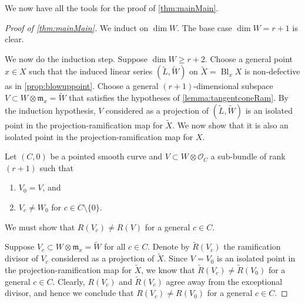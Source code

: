\documentclass[11pt,reqno]{amsart}
\theoremstyle{plain}
\theoremstyle{definition}
\theoremstyle{remark}
\numberwithin{equation}{section}
\DeclareMathOperator{\Bl}{Bl}
\numberwithin{equation}{section}
\renewcommand{\O}{\mathcal O}
\begin{document}
We now have all the tools for the proof of \autoref{thm:mainMain}. 
\begin{proof}[Proof of \autoref{thm:mainMain}]
  We induct on $\dim W$.
  The base case $\dim W = r+1$ is clear.

  We now do the induction step.
  Suppose $\dim W \geq r+2$.
  Choose a general point $x \in X$ such that the induced linear series $(\widetilde L, \widetilde W)$ on $\widetilde X = \Bl_x X$ is non-defective as in \autoref{prop:blowuppoint}.
  Choose a general $(r+1)$-dimensional subspace $V \subset W \otimes \mathfrak m_x = \widetilde W$ that satisfies the hypotheses of \autoref{lemma:tangentconeRam}.
  By the induction hypothesis, $V$ considered as a projection of $(\widetilde L, \widetilde W)$ is an isolated point in the projection-ramification map for $\widetilde X$.
  We now show that it is also an isolated point in the projection-ramification map for $X$.

  Let $(C, 0)$ be a pointed smooth curve and $V \subset W \otimes \O_C$ a sub-bundle of rank $(r+1)$ such that
  \begin{enumerate}
  \item $V_{0} = V$, and 
  \item $V_{c} \neq W_{0}$ for $c \in C \setminus \{0\}$.
  \end{enumerate}
  We must show that $R(V_c) \neq R(V)$ for a general $c \in C$.

  Suppose $V_c \subset W \otimes \mathfrak m_x = \widetilde W$ for all $c \in C$.
  Denote by $\widetilde R(V_c)$ the ramification divisor of $V_c$ considered as a projection of $\widetilde X$.
  Since $V = V_0$ is an isolated point in the projection-ramification map for $\widetilde X$, we know that $\widetilde R(V_c) \neq \widetilde R(V_0)$ for a general $c \in C$.
  Clearly, $R(V_c)$ and $\widetilde R(V_c)$ agree away from the exceptional divisor, and hence we conclude that $R(V_c) \neq R(V_0)$ for a general $c \in C$.


\end{proof}
\end{document}
